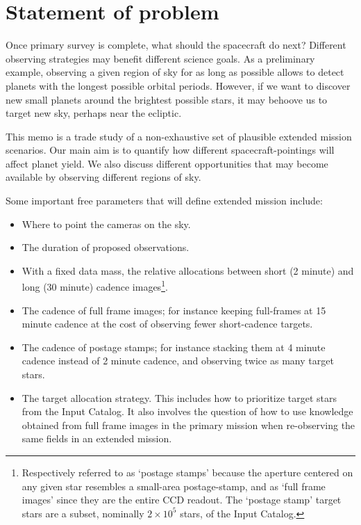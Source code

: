 \section{Statement of problem}
\label{sec:statement_of_problem}
Once \tesss primary survey is complete, what should the spacecraft do next? 
Different observing strategies may benefit different science goals. 
As a preliminary example, observing a given region of sky for as long as possible allows \tess to detect planets with the longest possible orbital periods.
However, if we want to discover new small planets around the brightest possible stars, it may behoove us to target new sky, perhaps near the ecliptic.


This memo is a trade study of a non-exhaustive set of plausible extended mission scenarios. 
Our main aim is to quantify how different spacecraft-pointings will affect \tesss planet yield.
We also discuss different opportunities that may become available by observing different regions of sky.

Some important free parameters that will define \tesss extended mission include:
\begin{itemize}
	\item Where to point the cameras on the sky.
	\item The duration of proposed observations.
	\item With a fixed data mass, the relative allocations between short (2 minute) and long (30 minute) cadence images\footnote{Respectively referred to as `postage stamps' because the aperture centered on any given star resembles a small-area postage-stamp, and as `full frame images' since they are the entire CCD readout. The `postage stamp' target stars are a subset, nominally $2\times 10^5$ stars, of the \tess Input Catalog.}. 
	\item The cadence of full frame images; for instance keeping full-frames at 15 minute cadence at the cost of observing fewer short-cadence targets.
	\item The cadence of postage stamps; for instance stacking them at 4 minute cadence instead of 2 minute cadence, and observing twice as many target stars.
	\item The target allocation strategy. This includes how to prioritize target stars from the \tess Input Catalog. It also involves the question of how to use knowledge obtained from full frame images in the primary mission when re-observing the same fields in an extended mission.
\end{itemize}

